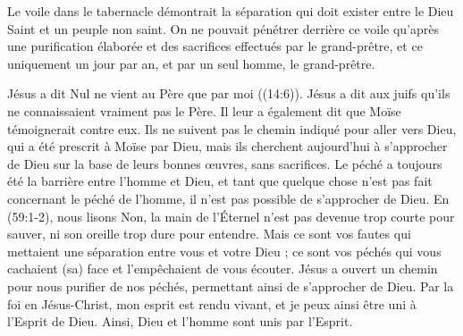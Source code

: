 Le voile dans le tabernacle démontrait la séparation qui doit exister entre
 le Dieu Saint et un peuple non saint.
 On ne pouvait pénétrer derrière ce voile qu'après une purification élaborée
 et des sacrifices effectués par le grand-prêtre,
 et ce uniquement un jour par an, et par un seul homme, le grand-prêtre.

Jésus a dit\frcolon{} \Og Nul ne vient au Père que par moi \Fg{}
 ((14:6)).
 Jésus a dit aux juifs qu'ils ne connaissaient vraiment pas le Père.
 Il leur a également dit que Moïse témoignerait contre eux.
 Ils ne suivent pas le chemin indiqué pour aller vers Dieu, qui a été prescrit
 à Moïse par Dieu, mais ils cherchent aujourd'hui à s'approcher de Dieu
 sur la base de leurs bonnes œuvres, sans sacrifices.
 Le péché a toujours été la barrière entre l'homme et Dieu, et tant
 que quelque chose n'est pas fait concernant le péché de l'homme,
 il n'est pas possible de s'approcher de Dieu.
 En (59:1-2), nous lisons\frcolon{}
 \Og Non, la main de l'Éternel n'est pas devenue trop courte pour sauver,
 ni son oreille trop dure pour entendre.
 Mais ce sont vos fautes qui mettaient une séparation entre vous et votre Dieu ;
 ce sont vos péchés qui vous cachaient (sa) face et l'empêchaient
 de vous écouter. \Fg{}
 Jésus a ouvert un chemin pour nous purifier de nos péchés,
 permettant ainsi de s'approcher de Dieu.
 Par la foi en Jésus-Christ, mon esprit est rendu vivant, et je peux ainsi
 être uni à l'Esprit de Dieu. Ainsi, Dieu et l'homme sont unis par l'Esprit.
\closechapter

